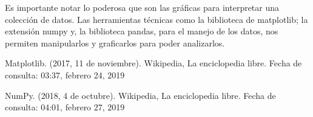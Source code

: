 \documentclass[12pt,a4paper]{article}
\begin{document}
\noindent Es importante notar lo poderosa que son las gráficas para interpretar una colección de datos. Las herramientas técnicas como la biblioteca de matplotlib; la extensión numpy y, la biblioteca pandas, para el manejo de los datos, nos permiten manipularlos y graficarlos para poder analizarlos.
 



\begin{thebibliography}{0}


Matplotlib. (2017, 11 de noviembre). Wikipedia, La enciclopedia libre. Fecha de consulta: 03:37, febrero 24, 2019 

NumPy. (2018, 4 de octubre). Wikipedia, La enciclopedia libre. Fecha de consulta: 04:01, febrero 27, 2019 


\end{thebibliography}
\end{document}
